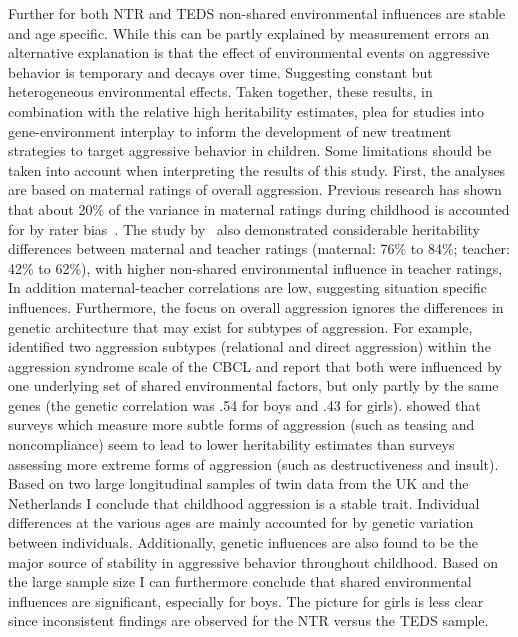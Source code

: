 Further for both NTR and TEDS non-shared environmental influences are stable and age specific.
While this can be partly explained by measurement errors an alternative explanation is that the effect of environmental events on aggressive behavior is temporary and decays over time.
Suggesting constant but heterogeneous environmental effects.
Taken together, these results, in combination with the relative high heritability estimates, plea for studies into gene-environment interplay to inform the development of new treatment strategies	to target aggressive behavior in children.
Some limitations should be taken into account when interpreting the results of this study.
First, the analyses are based on maternal ratings of overall aggression.
Previous research has shown that about 20\% of the variance in maternal ratings during childhood is accounted for by rater bias~\cite{Bartels2007}.
The study by~\citet{Haberstick2006} also demonstrated considerable heritability differences between maternal and teacher ratings (maternal: 76\% to 84\%; teacher: 42\% to 62\%), with higher non-shared environmental influence in teacher ratings, In addition maternal-teacher correlations are low, suggesting situation specific influences.
Furthermore, the focus on overall aggression ignores the differences in genetic architecture that may exist for subtypes of aggression.
For example,~\citet{Ligthart2005} identified two aggression subtypes (relational and direct aggression) within the aggression syndrome scale of the CBCL and report that both were influenced by one underlying set of shared environmental factors, but only partly by the same genes (the genetic correlation was .54 for boys and .43 for girls).
\citet{Ghodsian-Carpey1987} showed that surveys which measure more subtle forms of aggression (such as teasing and noncompliance) seem to lead to lower heritability estimates than surveys assessing more extreme forms of aggression (such as destructiveness and insult).
Based on two large longitudinal samples of twin data from the UK and the Netherlands I conclude that childhood aggression is a stable trait.
Individual differences at the various ages are mainly accounted for by genetic variation between individuals.
Additionally, genetic influences are also found to be the major source of stability in aggressive behavior throughout childhood.
Based on the large sample size I can furthermore conclude that shared environmental influences are significant, especially for boys.
The picture for girls is less clear since inconsistent findings are observed for the NTR versus the TEDS sample.
